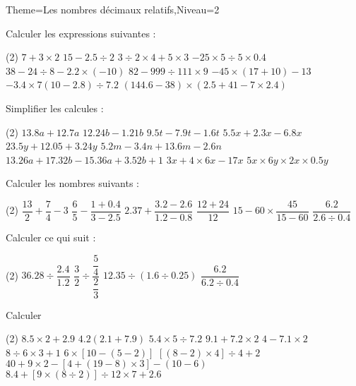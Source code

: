 \documentclass[a4paper,12pt]{article}
\begin{document}
\begin{Maquette}[Fiche]{Theme=Les nombres décimaux relatifs,Niveau=2}
\begin{exercice}
Calculer les expressions suivantes :
\begin{tasks}(2)
\task $7+3\times 2$
\task $15-2.5\div 2$
\task $3\div 2\times 4+5\times 3$
\task $-25\times 5\div 5\times 0.4$
\task $38-24\div 8-2.2\times (-10)$
\task $82-999\div 111\times 9$
\task $-45\times(17+10)-13$
\task $-3.4\times 7(10-2.8)\div 7.2$
\task $(144.6-38)\times(2.5+41-7\times 2.4)$
\end{tasks}
\end{exercice}

\begin{exercice}
Simplifier les calcules :
\begin{tasks}(2)
\task $13.8a+12.7a$
\task $12.24b-1.21b$
\task $9.5t-7.9t-1.6t$
\task $5.5x+2.3x-6.8x$
\task $23.5y+12.05+3.24y$
\task $5.2m-3.4n+13.6m-2.6n$
\task $13.26a+17.32b-15.36a+3.52b+1$
\task $3x+4\times 6x-17x$
\task $5x\times 6y\times2x \times0.5y$
\end{tasks}
\end{exercice}

\begin{exercice}
Calculer les nombres suivants :
\begin{tasks}(2)
\task $\dfrac{13}{2}+\dfrac{7}{4}-3$
\task $\dfrac{6}{5}-\dfrac{1+0.4}{3-2.5}$
\task $2.37+\dfrac{3.2-2.6}{1.2-0.8}$
\task $\dfrac{12+24}{12}$
\task $15-60\times \dfrac{45}{15-60}$
\task $\dfrac{6.2}{2.6\div 0.4}$
\end{tasks}
\end{exercice}

\begin{exercice}
Calculer ce qui suit :
\begin{tasks}(2)
\task $36.28\div \dfrac{2.4}{1.2}$
\task $\dfrac{3}{2}\div\dfrac{\dfrac{5}{4}}{\dfrac{2}{3}}$
\task $12.35\div (1.6\div 0.25)$
\task $\dfrac{6.2}{6.2\div 0.4}$
\end{tasks}
\end{exercice}

\begin{exercice}
Calculer 
\begin{tasks}(2)
\task $8.5\times 2+2.9$
\task $4.2(2.1+7.9)$
\task $5.4\times 5\div 7.2$
\task $9.1+7.2\times 2$
\task $4-7.1\times 2$
\task $8\div 6\times 3+1$
\task $6\times[10-(5-2)]$
\task $[(8-2)\times 4]\div 4+2$
\task* $40+9\times 2-[4+(19-8)\times 3]-(10-6)$
\task* $8.4+[9\times(8\div 2)]\div 12\times 7+2.6$
\end{tasks}
\end{exercice}





\end{Maquette}
\end{document}
